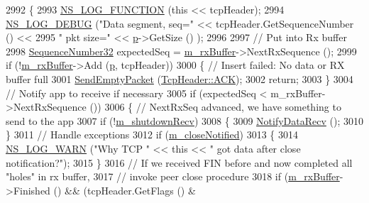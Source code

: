 \begin{DoxyCode}
2992 \{
2993   \hyperlink{log-macros-disabled_8h_a90b90d5bad1f39cb1b64923ea94c0761}{NS\_LOG\_FUNCTION} (\textcolor{keyword}{this} << tcpHeader);
2994   \hyperlink{group__logging_ga413f1886406d49f59a6a0a89b77b4d0a}{NS\_LOG\_DEBUG} (\textcolor{stringliteral}{"Data segment, seq="} << tcpHeader.GetSequenceNumber () <<
2995                 \textcolor{stringliteral}{" pkt size="} << \hyperlink{lte__link__budget_8m_ac9de518908a968428863f829398a4e62}{p}->GetSize () );
2996 
2997   \textcolor{comment}{// Put into Rx buffer}
2998   \hyperlink{group__network_gacb2070e4e98d2d5135c9bede58f07a03}{SequenceNumber32} expectedSeq = \hyperlink{classns3_1_1TcpSocketBase_a0163894148e5a70e6bd89970a1483fae}{m\_rxBuffer}->NextRxSequence ();
2999   \textcolor{keywordflow}{if} (!\hyperlink{classns3_1_1TcpSocketBase_a0163894148e5a70e6bd89970a1483fae}{m\_rxBuffer}->Add (\hyperlink{lte__link__budget_8m_ac9de518908a968428863f829398a4e62}{p}, tcpHeader))
3000     \{ \textcolor{comment}{// Insert failed: No data or RX buffer full}
3001       \hyperlink{classns3_1_1TcpSocketBase_aa858913c9a4480a14d293f1014905b3e}{SendEmptyPacket} (\hyperlink{classns3_1_1TcpHeader_a5f3d432941327854b5ad621e467479c6a1182e63050402c9f49208c62c1ec2d5c}{TcpHeader::ACK});
3002       \textcolor{keywordflow}{return};
3003     \}
3004   \textcolor{comment}{// Notify app to receive if necessary}
3005   \textcolor{keywordflow}{if} (expectedSeq < m\_rxBuffer->NextRxSequence ())
3006     \{ \textcolor{comment}{// NextRxSeq advanced, we have something to send to the app}
3007       \textcolor{keywordflow}{if} (!\hyperlink{classns3_1_1TcpSocketBase_a946e6fc03360915a21e089f9cd8cf279}{m\_shutdownRecv})
3008         \{
3009           \hyperlink{classns3_1_1Socket_a91fa3046bbd0a7644381f1d2481bdfef}{NotifyDataRecv} ();
3010         \}
3011       \textcolor{comment}{// Handle exceptions}
3012       \textcolor{keywordflow}{if} (\hyperlink{classns3_1_1TcpSocketBase_a8b9716e924553832a827b6efe214b70f}{m\_closeNotified})
3013         \{
3014           \hyperlink{group__logging_gade7208b4009cdf0e25783cd26766f559}{NS\_LOG\_WARN} (\textcolor{stringliteral}{"Why TCP "} << \textcolor{keyword}{this} << \textcolor{stringliteral}{" got data after close notification?"});
3015         \}
3016       \textcolor{comment}{// If we received FIN before and now completed all "holes" in rx buffer,}
3017       \textcolor{comment}{// invoke peer close procedure}
3018       \textcolor{keywordflow}{if} (\hyperlink{classns3_1_1TcpSocketBase_a0163894148e5a70e6bd89970a1483fae}{m\_rxBuffer}->Finished () && (tcpHeader.GetFlags () & 

\end{DoxyCode}
